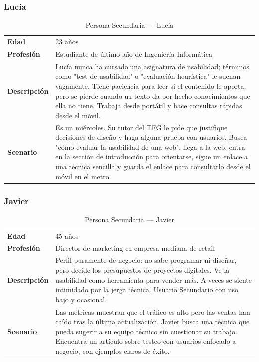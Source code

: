 \documentclass[12pt, a4paper]{report}
\begin{document}
\subsubsection{Lucía}

\begin{table}[H]
\centering
\begin{tabularx}{\linewidth}{lX}
\toprule
\textbf{Edad} & 23 años \\
\textbf{Profesión} & Estudiante de último año de Ingeniería Informática \\
\midrule
\textbf{Descripción} &
Lucía nunca ha cursado una asignatura de usabilidad; términos como "test de usabilidad" o
"evaluación heurística" le suenan vagamente. Tiene paciencia para leer si el contenido le aporta,
pero se pierde cuando un texto da por hecho conocimientos que ella no tiene. Trabaja desde portátil
y hace consultas rápidas desde el móvil. \\[4pt]
\textbf{Scenario} &
Es un miércoles. Su tutor del TFG le pide que justifique decisiones de diseño y haga alguna prueba
con usuarios. Busca "cómo evaluar la usabilidad de una web", llega a la web, entra en la sección
de introducción para orientarse, sigue un enlace a una técnica sencilla y guarda el enlace para
consultarlo desde el móvil en el metro. \\
\bottomrule
\end{tabularx}
\caption{Persona Secundaria — Lucía}
\end{table}

\subsubsection{Javier}

\begin{table}[H]
\centering
\begin{tabularx}{\linewidth}{lX}
\toprule
\textbf{Edad} & 45 años \\
\textbf{Profesión} & Director de marketing en empresa mediana de retail \\
\midrule
\textbf{Descripción} &
Perfil puramente de negocio: no sabe programar ni diseñar, pero decide los presupuestos de
proyectos digitales. Ve la usabilidad como herramienta para vender más. A veces se siente
intimidado por la jerga técnica. Usuario Secundario con uso bajo y ocasional. \\[4pt]
\textbf{Scenario} &
Las métricas muestran que el tráfico es alto pero las ventas han caído tras la última actualización.
Javier busca una técnica que pueda sugerir a su equipo técnico sin cuestionar su trabajo. Encuentra
un artículo sobre testeo con usuarios enfocado a negocio, con ejemplos claros de éxito. \\
\bottomrule
\end{tabularx}
\caption{Persona Secundaria — Javier}
\end{table}
\end{document}
